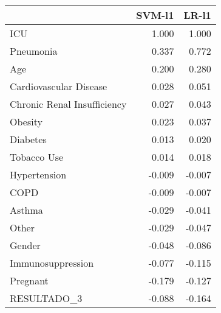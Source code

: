 \begin{tabular}{lrr}
\toprule
{} &  SVM-l1 &  LR-l1 \\
\midrule
ICU                         &   1.000 &  1.000 \\
Pneumonia                   &   0.337 &  0.772 \\
Age                         &   0.200 &  0.280 \\
Cardiovascular Disease      &   0.028 &  0.051 \\
Chronic Renal Insufficiency &   0.027 &  0.043 \\
Obesity                     &   0.023 &  0.037 \\
Diabetes                    &   0.013 &  0.020 \\
Tobacco Use                 &   0.014 &  0.018 \\
Hypertension                &  -0.009 & -0.007 \\
COPD                        &  -0.009 & -0.007 \\
Asthma                      &  -0.029 & -0.041 \\
Other                       &  -0.029 & -0.047 \\
Gender                      &  -0.048 & -0.086 \\
Immunosuppression           &  -0.077 & -0.115 \\
Pregnant                    &  -0.179 & -0.127 \\
RESULTADO\_3                 &  -0.088 & -0.164 \\
\bottomrule
\end{tabular}
